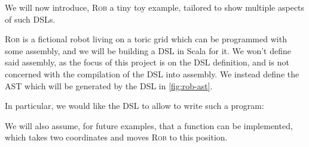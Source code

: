 \newcommand{\rob}[0]{\textsc{Rob}}

We will now introduce, \rob{} a tiny toy example,
tailored to show multiple aspects of such DSLs.

\rob{} is a fictional robot living on a toric grid which can be programmed with some assembly,
and we will be building a DSL in Scala for it.
We won't define said assembly, as the focus of this project is on the DSL definition,
and is not concerned with the compilation of the DSL into assembly.
We instead define the AST which will be generated by the DSL in \cref{fig:rob-ast}.

\begin{figure*}

\caption{\rob{}'s AST.}
\label{fig:rob-ast}
\end{figure*}

In particular, we would like the DSL to allow to write such a program:


We will also assume, for future examples,
that a  function can be implemented, 
which takes two coordinates and moves \rob{} to this position.
